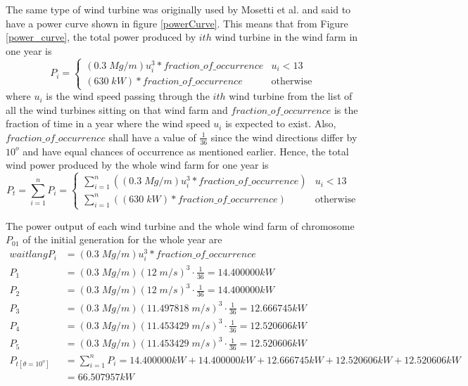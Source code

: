     The same type of wind turbine was originally used by Mosetti et al. \cite{windturbine5} and said to have a power curve shown in figure \ref{powerCurve}. This means that from Figure \ref{power_curve}, the total power produced by $ith$ wind turbine in the wind farm in one year is
    \begin{equation}
        P_i=
        \begin{cases}
            \left(0.3\;Mg/m\right)u_i^3*fraction\_of\_occurrence    & u_i<13 \\
            \left(630\;kW\right)*fraction\_of\_occurrence         & \text{otherwise}
        \end{cases}
    \end{equation}
   where $u_i$ is the wind speed passing through the $ith$ wind turbine from the list of all the wind turbines sitting on that wind farm and $fraction\_of\_occurrence$ is the fraction of time in a year where the wind speed $u_i$ is expected to exist. Also, $fraction\_of\_occurrence$ shall have a value of $\frac{1}{36}$ since the wind directions differ by $10^o$ and have equal chances of occurrence as mentioned earlier. Hence, the total wind power produced by the whole wind farm for one year is
    \begin{equation}
        P_t=\sum_{i=1}^n P_i=
        \begin{cases}
            \sum_{i=1}^n \left( \left(0.3\;Mg/m\right)u_i^3*fraction\_of\_occurrence\right)    & u_i<13 \\
            \sum_{i=1}^n \left( \left(630\;kW\right)*fraction\_of\_occurrence\right)         & \text{otherwise}
        \end{cases}
    \end{equation}
    
    The power output of each wind turbine and the whole wind farm of chromosome $P_{01}$ of the initial generation for the whole year are
    \begin{align*} wait lang
        P_i
        &= \left(0.3\;Mg/m\right)u_i^3*fraction\_of\_occurrence \\
        P_1
        &= \left(0.3\;Mg/m\right)\left(12\;m/s\right)^3\cdot\frac{1}{36} = 14.400000kW \\
        P_2
        &= \left(0.3\;Mg/m\right)\left(12\;m/s\right)^3\cdot\frac{1}{36} = 14.400000kW\\
        P_3
        &= \left(0.3\;Mg/m\right)\left(11.497818\;m/s\right)^3\cdot\frac{1}{36} = 12.666745kW\\
        P_4
        &= \left(0.3\;Mg/m\right)\left(11.453429\;m/s\right)^3\cdot\frac{1}{36} = 12.520606kW\\
        P_5
        &= \left(0.3\;Mg/m\right)\left(11.453429\;m/s\right)^3\cdot\frac{1}{36} = 12.520606kW\\
        P_{t[\theta=10^o]}
        &=\sum_{i=1}^n P_i = 14.400000kW+14.400000kW+12.666745kW+12.520606kW+12.520606kW\\
        &=66.507957kW
    \end{align*}
    
